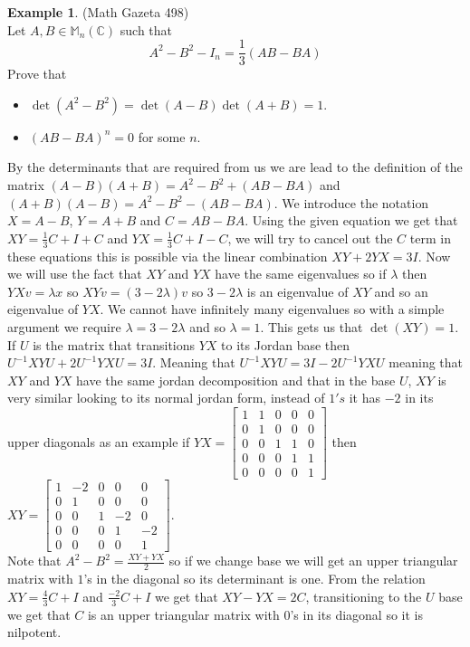 \documentclass[12pt]{article}
\theoremstyle{definition}
\newtheorem*{example}{Example}
\theoremstyle{remark}
\theoremstyle{plain}
\begin{document}
\begin{example}\textup{(Math Gazeta 498)}\leavevmode \\
    Let $A,B\in \mathbb{M}_n(\mathbb{C})$ such that $$A^2-B^2-I_n=\frac{1}{3}(AB-BA)$$
    Prove that \begin{itemize}
        \item $\det(A^2-B^2)=\det(A-B)\det(A+B)=1$.
        \item $(AB-BA)^n=0$ for some $n$.
    \end{itemize}
    By the determinants that are required from us we are lead to the definition of the matrix $(A-B)(A+B)=A^2-B^2+(AB-BA)$ and $(A+B)(A-B)=A^2-B^2-(AB-BA)$. We introduce the notation $X=A-B$, $Y=A+B$ and $C=AB-BA$.
    Using the given equation we get that $XY=\frac{1}{3}C+I+C$ and $YX=\frac{1}{3}C+I-C$, we will try to cancel out the $C$ term in these equations this is possible via the linear combination $XY+2YX=3I$. Now we will use the fact that $XY$ and $YX$ have the same eigenvalues so if $\lambda$ then $YXv=\lambda x$ so $XY v=(3-2\lambda)v$ so $3-2\lambda$ is an eigenvalue of $XY$ and so an eigenvalue of $YX$. We cannot have infinitely many eigenvalues so with a simple argument we require $\lambda=3-2\lambda$ and so $\lambda=1$.
    This gets us that $\det(XY)=1$.
    If $U$ is the matrix that transitions $YX$ to its Jordan base then $U^{-1}XYU+2U^{-1}YXU=3I$. Meaning that $U^{-1}XYU=3I-2U^{-1}YXU$
    meaning that $XY$ and $YX$ have the same jordan decomposition and that in the base $U$, $XY$ is very similar looking to its normal jordan form, instead of $1's$ it has $-2$ in its upper diagonals as an example if $YX= \begin{bmatrix}
1 & 1 & 0 & 0 & 0 \\
0 & 1 & 0 & 0 & 0 \\
0 & 0 & 1 & 1 & 0 \\
0 & 0 & 0 & 1 & 1 \\
0 & 0 & 0 & 0 & 1
\end{bmatrix}$ then $XY= \begin{bmatrix}
1 & -2 & 0 & 0 & 0 \\
0 & 1 & 0 & 0 & 0 \\
0 & 0 & 1 & -2 & 0 \\
0 & 0 & 0 & 1 & -2 \\
0 & 0 & 0 & 0 & 1
\end{bmatrix}$.\\
Note that $A^2-B^2=\frac{XY+YX}{2}$ so if we change base we will get an upper triangular matrix with $1$'s in the diagonal so its determinant is one.
From the relation $XY=\frac{4}{3}C+I$ and $\frac{-2}{3}C+I$ we get that $XY-YX=2C$, transitioning to the $U$ base we get that $C$ is an upper triangular matrix with $0$'s in its diagonal so it is nilpotent.
\end{example}
\end{document}
